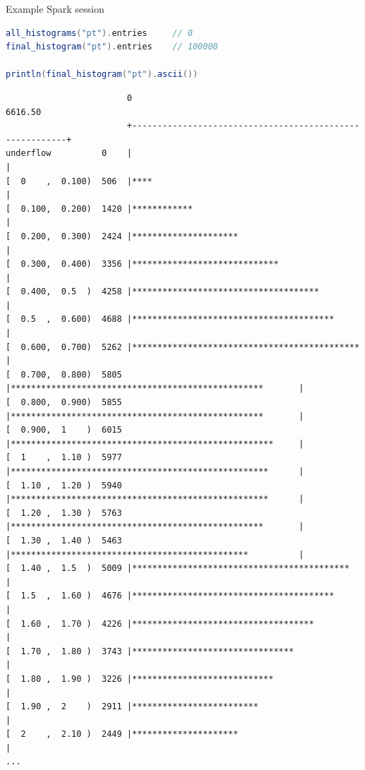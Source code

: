 \documentclass{beamer}
\begin{document}
\begin{frame}[fragile]{Example Spark session}
\begin{lstlisting}[language=scala]
all_histograms("pt").entries     // 0
final_histogram("pt").entries    // 100000

println(final_histogram("pt").ascii())
\end{lstlisting}
\tiny
\begin{verbatim}
                        0                                                   6616.50
                        +---------------------------------------------------------+
underflow          0    |                                                         |
[  0    ,  0.100)  506  |****                                                     |
[  0.100,  0.200)  1420 |************                                             |
[  0.200,  0.300)  2424 |*********************                                    |
[  0.300,  0.400)  3356 |*****************************                            |
[  0.400,  0.5  )  4258 |*************************************                    |
[  0.5  ,  0.600)  4688 |****************************************                 |
[  0.600,  0.700)  5262 |*********************************************            |
[  0.700,  0.800)  5805 |**************************************************       |
[  0.800,  0.900)  5855 |**************************************************       |
[  0.900,  1    )  6015 |****************************************************     |
[  1    ,  1.10 )  5977 |***************************************************      |
[  1.10 ,  1.20 )  5940 |***************************************************      |
[  1.20 ,  1.30 )  5763 |**************************************************       |
[  1.30 ,  1.40 )  5463 |***********************************************          |
[  1.40 ,  1.5  )  5009 |*******************************************              |
[  1.5  ,  1.60 )  4676 |****************************************                 |
[  1.60 ,  1.70 )  4226 |************************************                     |
[  1.70 ,  1.80 )  3743 |********************************                         |
[  1.80 ,  1.90 )  3226 |****************************                             |
[  1.90 ,  2    )  2911 |*************************                                |
[  2    ,  2.10 )  2449 |*********************                                    |
...
\end{verbatim}
\end{frame}
\end{document}
